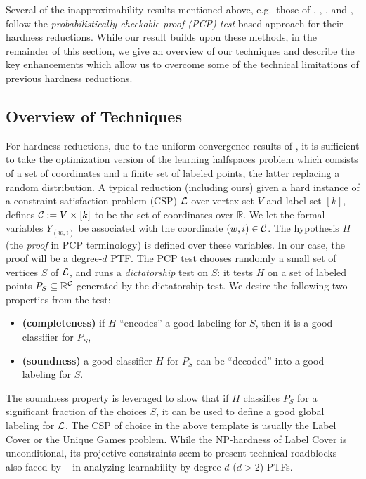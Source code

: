 Several of the inapproximability results mentioned above, e.g.~those of \cite{GR09}, \cite{GKS10}, \cite{KS11}, \cite{FGRW12} and \cite{DOSW11},
follow the \emph{probabilistically checkable proof
(PCP) test} based approach for
their hardness reductions. While our result builds upon these methods,
in the remainder of this section, we give an overview of our techniques
and describe the key enhancements which allow us to overcome some of
the technical limitations of previous hardness reductions.

\subsection{Overview of Techniques}

For hardness reductions, due to the uniform convergence results of \cite{Hau92, KSS94}, it is sufficient to take the optimization 
version of the learning halfspaces problem which consists of a set of
coordinates and a finite set of labeled points, the latter 
replacing a random distribution. A typical reduction (including ours)
given a hard instance of a constraint satisfaction problem (CSP) $\mathcal{L}$ over
vertex set $V$ and label set $[k]$, defines $\mathcal{C} := V\times [k]$
to be the set of coordinates over $\mathbb{R}$.
We let the formal variables
$Y_{(w,i)}$ be associated with the coordinate $(w,i) \in \mathcal{C}$.
The hypothesis $H$ (the
\emph{proof} in PCP terminology) is defined
over these variables. In our case, the proof will be a degree-$d$ PTF. The PCP test chooses
randomly a small set of vertices $S$
of $\mathcal{L}$, and runs a \emph{dictatorship} test on $S$: it tests $H$ on a set
of labeled points $P_S \subseteq \mathbb{R}^{\mathcal{C}}$ generated by the
dictatorship test. We desire the following two properties from the test: 
\begin{itemize}
\item \textbf{(completeness)} if $H$
``encodes'' a
good labeling for $S$, then it is a good classifier for  $P_S$,
\item \textbf{(soundness)} a good classifier $H$ for
$P_S$ can be ``decoded'' into a good labeling for $S$. 
\end{itemize}
 The soundness
property is leveraged to show that if $H$ classifies
$P_S$ for a significant fraction of the choices $S$, it can be used to
define a good global labeling for $\mathcal{L}$.
The CSP of choice in the above template is usually the Label Cover or
the Unique Games problem. While the NP-hardness of Label Cover is
unconditional, its projective constraints seem to present 
technical roadblocks --
also faced by \cite{DOSW11} -- in analyzing 
learnability by  degree-$d$  ($d > 2$) PTFs.

